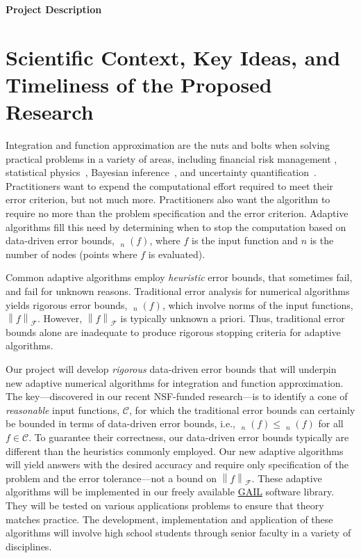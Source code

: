\documentclass[11pt]{NSFamsart}
\newcommand{\GAIL}{\hyperlink{GAILlink}{GAIL}\xspace}
\DeclareMathOperator{\err}{err}
\DeclareMathOperator{\oerr}{\overline{\err}}
\DeclareMathOperator{\herr}{\widehat{\err}}
\newcommand{\cc}{\mathcal{C}}
\newcommand{\calf}{{\mathcal{F}}}
\newcommand{\norm}[2][{}]{\ensuremath{\left \lVert #2 \right \rVert}_{#1}}
\begin{document}

\centerline{\Large \textbf{Project Description}}
\vspace{-2ex}

\setcounter{tocdepth}{1}
\tableofcontents

\vspace{-6ex}

\section{Scientific Context, Key Ideas,  and Timeliness of the Proposed Research}
Integration and function approximation are the nuts and bolts when 
solving practical problems in a variety of areas, including financial risk management \cite{Gla03}, 
statistical physics~\cite{LanBin14}, 
Bayesian inference~\cite{GelEtal13}, and uncertainty quantification~\cite{ForEtal09, Smi14a}.  
Practitioners 
want to expend the  
computational effort required to meet their error criterion, but not much more. 
Practitioners also want the algorithm to require no more than the problem specification and the 
error criterion.   Adaptive algorithms fill this need by determining when to stop the computation 
based on data-driven error bounds, $\herr_n(f)$, where $f$ is the input function and $n$ is the 
number of nodes (points where $f$ is evaluated).

Common adaptive algorithms employ \emph{heuristic} error bounds, that sometimes fail, and fail for 
unknown reasons. Traditional error 
analysis for numerical algorithms 
yields rigorous error bounds, $\oerr_n(f)$, which involve norms of the input functions, 
$\norm[\calf]{f}$.  However, $\norm[\calf]{f}$ is typically unknown a 
priori.  Thus, traditional  error 
bounds alone are inadequate  to produce rigorous stopping criteria for adaptive algorithms.

Our project will develop \emph{rigorous} data-driven error bounds that will underpin new adaptive 
numerical algorithms for integration and function approximation.  The 
key---discovered in our recent NSF-funded research---is to identify a cone of \emph{reasonable} 
input functions, 
$\cc$,  for which the traditional error bounds can certainly be bounded in terms of 
data-driven error bounds, i.e., $\oerr_n(f) \le \herr_n(f)$ for all $f \in \cc$.  To guarantee their 
correctness, our data-driven error bounds typically are different than the heuristics commonly 
employed.
Our new adaptive algorithms will yield answers with the desired accuracy and require only 
specification of the problem and the error tolerance---not a bound on $\norm[\calf]{f}$. 
These adaptive algorithms will be implemented in our freely available \GAIL software library.  They 
will 
be tested on various applications problems to ensure that theory matches practice.  The 
development, implementation and application of these algorithms will involve high school 
students through senior faculty in a variety of disciplines.
\end{document}
